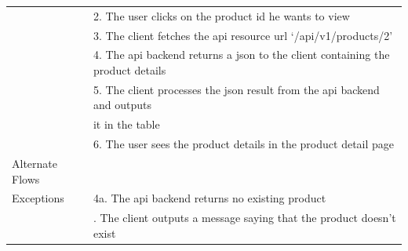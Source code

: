 \documentclass{report}
\begin{document}
\begin{tabular}{ l l }
					& 2. The user clicks on the product id he wants to view \\
					& 3. The client fetches the api resource url ‘/api/v1/products/2’ \\ 
					& 4. The api backend returns a json to the client containing the product details \\ 
					& 5. The client processes the json result from the api backend and outputs \\
					& it in the table \\
					& 6. The user sees the product details in the product detail page \\
Alternate Flows		& \\
Exceptions 			& 4a. The api backend returns no existing product \\
					& \qquad 1. The client outputs a message saying that the product doesn’t exist \\

\end{tabular}
\newpage
\end{document}
